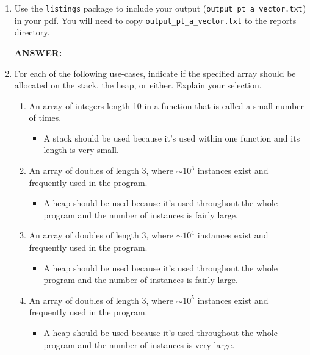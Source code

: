 


\maketitle
\begin{enumerate}
    \item Use the \texttt{listings} package to include your output (\texttt{output\_pt\_a\_vector.txt}) in your pdf.  You will need to copy \texttt{output\_pt\_a\_vector.txt} to the reports directory.

    \textbf{ANSWER:} 
    

    \item For each of the following use-cases, indicate if the specified array should be allocated on the stack, the heap, or either.  Explain your selection.
    \begin{enumerate}
        \item An array of integers length 10 in a function that is called a small number of times.
        \begin{itemize}
            \item A stack should be used because it's used within one function and its length is very small.
        \end{itemize}
        \item An array of doubles of length 3, where $\sim 10^3$ instances exist and frequently used in the program.
        \begin{itemize}
            \item A heap should be used because it's used throughout the whole program and the number of instances is fairly large.
        \end{itemize}
        \item An array of doubles of length 3, where $\sim 10^4$ instances exist and frequently used in the program.
        \begin{itemize}
            \item A heap should be used because it's used throughout the whole program and the number of instances is fairly large.
        \end{itemize}
        \item An array of doubles of length 3, where $\sim 10^5$ instances exist and frequently used in the program.
        \begin{itemize}
            \item A heap should be used because it's used throughout the whole program and the number of instances is very large.

\end{itemize}
\end{enumerate}
\end{enumerate}
